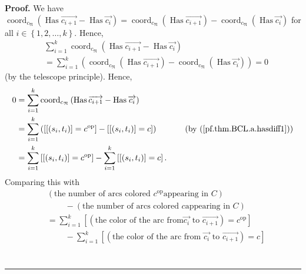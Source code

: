 \documentclass[numbers=enddot,12pt,final,onecolumn,notitlepage,abstracton]{scrartcl}%
\theoremstyle{definition}
\newenvironment{proof}[1][Proof]{\noindent\textbf{#1.} }{\ \rule{0.5em}{0.5em}}
\let\sumnonlimits\sum
\renewcommand{\sum}{\sumnonlimits\limits}
\begin{document}
\begin{proof}
We have $\operatorname*{coord}\nolimits_{c_{\mathfrak{N}}}\left(
\operatorname*{Has}\overrightarrow{c_{i+1}}-\operatorname*{Has}%
\overrightarrow{c_{i}}\right)  =\operatorname*{coord}%
\nolimits_{c_{\mathfrak{N}}}\left(  \operatorname*{Has}\overrightarrow{c_{i+1}%
}\right)  -\operatorname*{coord}\nolimits_{c_{\mathfrak{N}}}\left(
\operatorname*{Has}\overrightarrow{c_{i}}\right)  $ for all $i\in\left\{
1,2,\ldots,k\right\}  $. Hence,%
\begin{align*}
&  \sum_{i=1}^{k}\operatorname*{coord}\nolimits_{c_{\mathfrak{N}}}\left(
\operatorname*{Has}\overrightarrow{c_{i+1}}-\operatorname*{Has}%
\overrightarrow{c_{i}}\right) \\
&  =\sum_{i=1}^{k}\left(  \operatorname*{coord}\nolimits_{c_{\mathfrak{N}}%
}\left(  \operatorname*{Has}\overrightarrow{c_{i+1}}\right)
-\operatorname*{coord}\nolimits_{c_{\mathfrak{N}}}\left(  \operatorname*{Has}%
\overrightarrow{c_{i}}\right)  \right)  =0
\end{align*}
(by the telescope principle). Hence,%
\begin{align*}
0  &  =\sum_{i=1}^{k}\operatorname*{coord}\nolimits_{c_{\mathfrak{N}}}\left(
\operatorname*{Has}\overrightarrow{c_{i+1}}-\operatorname*{Has}%
\overrightarrow{c_{i}}\right) \\
&  =\sum_{i=1}^{k}\left(  \left[  \left[  \left(  s_{i},t_{i}\right)  \right]
=c^{\operatorname*{op}}\right]  -\left[  \left[  \left(  s_{i},t_{i}\right)
\right]  =c\right]  \right)  \ \ \ \ \ \ \ \ \ \ \left(  \text{by
(\ref{pf.thm.BCL.a.hasdiff1})}\right) \\
&  =\sum_{i=1}^{k}\left[  \left[  \left(  s_{i},t_{i}\right)  \right]
=c^{\operatorname*{op}}\right]  -\sum_{i=1}^{k}\left[  \left[  \left(
s_{i},t_{i}\right)  \right]  =c\right]  .
\end{align*}
Comparing this with%
\begin{align*}
&  \left(  \text{the number of arcs colored }c^{\operatorname*{op}}\text{
appearing in }C\right) \\
&  \ \ \ \ \ \ \ \ \ \ -\left(  \text{the number of arcs colored }c\text{
appearing in }C\right) \\
&  =\sum_{i=1}^{k}\left[  \left(  \text{the color of the arc from
}\overrightarrow{c_{i}}\text{ to }\overrightarrow{c_{i+1}}\right)
=c^{\operatorname*{op}}\right] \\
&  \ \ \ \ \ \ \ \ \ \ -\sum_{i=1}^{k}\left[  \left(  \text{the color of the
arc from }\overrightarrow{c_{i}}\text{ to }\overrightarrow{c_{i+1}}\right)
=c\right] \\

\end{align*}
\end{proof}
\end{document}
